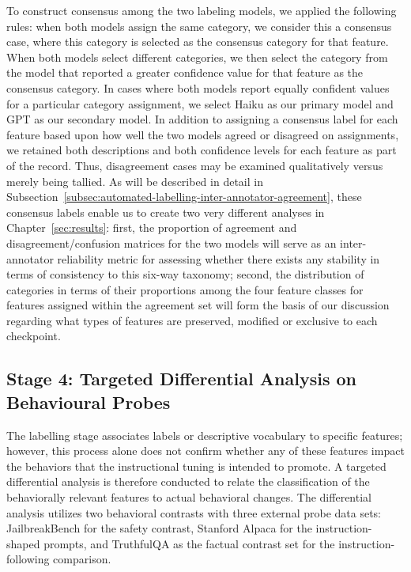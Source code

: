 To construct consensus among the two labeling models, we applied the following rules: when both models assign the same category, we consider this a consensus case, where this category is selected as the consensus category for that feature. When both models select different categories, we then select the category from the model that reported a greater confidence value for that feature as the consensus category. In cases where both models report equally confident values for a particular category assignment, we select Haiku as our primary model and GPT as our secondary model. In addition to assigning a consensus label for each feature based upon how well the two models agreed or disagreed on assignments, we retained both descriptions and both confidence levels for each feature as part of the record. Thus, disagreement cases may be examined qualitatively versus merely being tallied. As will be described in detail in Subsection~\ref{subsec:automated-labelling-inter-annotator-agreement}, these consensus labels enable us to create two very different analyses in Chapter~\ref{sec:results}: first, the proportion of agreement and disagreement/confusion matrices for the two models will serve as an inter-annotator reliability metric for assessing whether there exists any stability in terms of consistency to this six-way taxonomy; second, the distribution of categories in terms of their proportions among the four feature classes for features assigned within the agreement set will form the basis of our discussion regarding what types of features are preserved, modified or exclusive to each checkpoint.

\subsection{Stage 4: Targeted Differential Analysis on Behavioural Probes}
\label{subsec:targeted-differential-analysis}

The labelling stage associates labels or descriptive vocabulary to specific features; however, this process alone does not confirm whether any of these features impact the behaviors that the instructional tuning is intended to promote. A targeted differential analysis is therefore conducted to relate the classification of the behaviorally relevant features to actual behavioral changes. The differential analysis utilizes two behavioral contrasts with three external probe data sets: JailbreakBench \parencite{chao_jailbreakbench_2024} for the safety contrast, Stanford Alpaca \parencite{taori_stanford_alpaca_2023} for the instruction-shaped prompts, and TruthfulQA \parencite{lin_truthfulqa_2022} as the factual contrast set for the instruction-following comparison.

